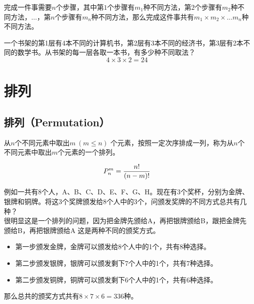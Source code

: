 \documentclass[12pt, openany, oneside]{book}
\begin{document}
完成一件事需要$ n $个步骤，其中第$ 1 $个步骤有$ m_1 $种不同方法，第$ 2 $个步骤有$ m_2 $种不同方法，$ \dots $，第$ n $个步骤有$ m_n $种不同方法，那么完成这件事共有$ m_1 \times m_2 \times \dots m_n $种不同方法。

\begin{tcolorbox}
	一个书架的第1层有4本不同的计算机书，第2层有3本不同的经济书，第3层有2本不同的数学书。从书架的每一层各取一本书，有多少种不同取法？
	$$
		4 \times 3 \times 2 = 24
	$$
\end{tcolorbox}

\newpage

\section{排列}

\subsection{排列（Permutation）}

从$ n $个不同元素中取出$ m\ (m \le n) $ 个元素，按照一定次序排成一列，称为从$ n $个不同元素中取出$ m $个元素的一个排列。

\vspace{-1cm}
\begin{align}
	P_n^m = {n! \over (n-m)!}
\end{align}

例如一共有8个人，A、B、C、D、E、F、G、H。现在有3个奖杯，分别为金牌、银牌和铜牌。将这3个奖牌颁发给8个人中的3个，问颁发奖牌的不同方式总共有几种？ \\

很明显这是一个排列的问题，因为把金牌先颁给A，再把银牌颁给B，跟把金牌先颁给B，再把银牌颁给A 这是两种不同的颁奖方式。

\begin{itemize}
	\item 第一步颁发金牌，金牌可以颁发给8个人中的1个，共有8种选择。

	\item 第二步颁发银牌，银牌可以颁发剩下7个人中的1个，共有7种选择。

	\item 第二步颁发铜牌，铜牌可以颁发剩下6个人中的1个，共有6种选择。
\end{itemize}

那么总共的颁奖方式共有$ 8 \times 7 \times 6 = 336 $种。
\end{document}
